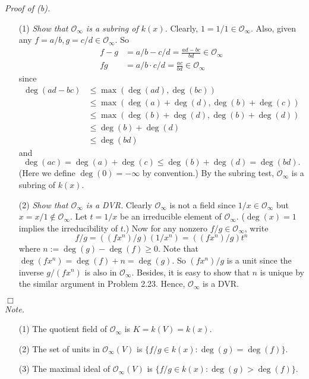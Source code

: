 \documentclass{article}
\begin{document}
\emph{Proof of (b).}
\begin{enumerate}
\item[(1)]
  \emph{Show that $\mathscr{O}_{\infty}$ is a subring of $k(x)$.}
  Clearly, $1 = 1/1 \in \mathscr{O}_{\infty}$.
  Also, given any $f = a/b, g = c/d \in \mathscr{O}_{\infty}$.
  So
  \begin{align*}
    f - g &= a/b - c/d = \frac{ad - bc}{bd} \in \mathscr{O}_{\infty} \\
    fg &= a/b \cdot c/d = \frac{ac}{bd} \in \mathscr{O}_{\infty}
  \end{align*}
  since
  \begin{align*}
    \deg(ad - bc)
    &\leq \max(\deg(ad), \deg(bc)) \\
    &\leq \max(\deg(a)+\deg(d), \deg(b)+\deg(c)) \\
    &\leq \max(\deg(b)+\deg(d), \deg(b)+\deg(d)) \\
    &\leq \deg(b) + \deg(d) \\
    &\leq \deg(bd)
  \end{align*}
  and
  \[
    \deg(ac) = \deg(a) + \deg(c) \leq \deg(b) + \deg(d) = \deg(bd).
  \]
  (Here we define $\deg(0) = -\infty$ by convention.)
  By the subring test, $\mathscr{O}_{\infty}$ is a subring of $k(x)$.

\item[(2)]
  \emph{Show that $\mathscr{O}_{\infty}$ is a DVR.}
  Clearly $\mathscr{O}_{\infty}$ is not a field
  since $1/x \in \mathscr{O}_{\infty}$ but $x = x/1 \not\in \mathscr{O}_{\infty}$.
  Let $t = 1/x$ be an irreducible element of $\mathscr{O}_{\infty}$.
  ($\deg(x) = 1$ implies the irreducibility of $t$.)
  Now for any nonzero $f/g \in \mathscr{O}_{\infty}$, write
  \[
    f/g = ((f x^n)/g) (1/x^n) = ((f x^n)/g) t^n
  \]
  where $n := \deg(g) - \deg(f) \geq 0$.
  Note that $\deg(fx^n) = \deg(f) + n = \deg(g)$.
  So $(f x^n)/g$ is a unit since the inverse $g/(f x^n)$ is also in $\mathscr{O}_{\infty}$.
  Besides, it is easy to show that $n$ is unique by the similar argument in Problem 2.23.
  Hence, $\mathscr{O}_{\infty}$ is a DVR.
\end{enumerate}
$\Box$ \\

\emph{Note.}
\begin{enumerate}
\item[(1)]
  The quotient field of $\mathscr{O}_{\infty}$ is $K = k(V) = k(x)$.

\item[(2)]
  The set of units in $\mathscr{O}_{\infty}(V)$ is
  $\{ f/g \in k(x) : \deg(g) = \deg(f) \}$.

\item[(3)]
  The maximal ideal of $\mathscr{O}_{\infty}(V)$ is
  $\{ f/g \in k(x) : \deg(g) > \deg(f) \}$. \\\\
\end{enumerate}
\end{document}
